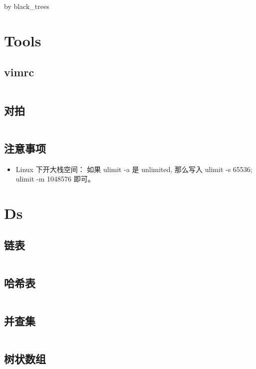 \documentclass[titlepage, a4paper]{article}
\begin{document}
	\begin{titlepage}
		by black\_trees
	\end{titlepage}
	\begin{multicols}{2}
		\setcounter{tocdepth}{3}
		\begingroup
		\let\cleardoublepage\relax
		\let\clearpage\relax
		\begin{small}
			\begin{spacing}{0.75}
				\tableofcontents
			\end{spacing}
		\end{small}
		\newpage
		\begin{spacing}{0.6}
			\section{Tools}
				\subsection{vimrc}
				 	\inputminted{vim}{src/Tools/.vimrc}
				 \subsection{对拍}
				 	\inputminted{sh}{src/Tools/stress.sh}
				 \subsection{注意事项}
				 	\begin{itemize}
				 		\item Linux 下开大栈空间： 如果 ulimit -a 是 unlimited, 那么写入 ulimit -s 65536; ulimit -m 1048576 即可。
				 	\end{itemize}
			 \section{Ds}
			 	\subsection{链表}
			 		\inputminted{cpp}{src/Ds/List.cpp}
			 	\subsection{哈希表}
			 		\inputminted{cpp}{src/Ds/Hash_table.cpp}
			 	\subsection{并查集}
			 		\inputminted{cpp}{src/Ds/Dsu.cpp}
			 	\subsection{树状数组}
			 		\inputminted{cpp}{src/Ds/Fenwick_tree.cpp}

\end{spacing}
\end{multicols}
\end{document}
